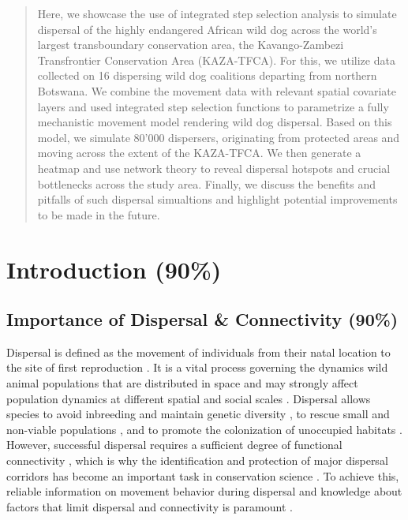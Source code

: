 \documentclass[abstract=on,10pt,a4paper,bibliography=totocnumbered]{article}
\begin{document}
\begin{abstract}
Here, we showcase the use of integrated step selection analysis to simulate
dispersal of the highly endangered African wild dog across the world's largest
transboundary conservation area, the Kavango-Zambezi Transfrontier Conservation
Area (KAZA-TFCA). For this, we utilize data collected on 16 dispersing wild dog
coalitions departing from northern Botswana. We combine the movement data with
relevant spatial covariate layers and used integrated step selection functions
to parametrize a fully mechanistic movement model rendering wild dog dispersal.
Based on this model, we simulate 80'000 dispersers, originating from protected
areas and moving across the extent of the KAZA-TFCA. We then generate a heatmap
and use network theory to reveal dispersal hotspots and crucial bottlenecks
across the study area. Finally, we discuss the benefits and pitfalls of such
dispersal simualtions and highlight potential improvements to be made in the
future.
\end{abstract}

\newpage

\onehalfspacing
\tableofcontents
\doublespacing

\newpage
{}

\linenumbers

\section{Introduction (90\%)}

\subsection{Importance of Dispersal \& Connectivity (90\%)}
Dispersal is defined as the movement of individuals from their natal location to
the site of first reproduction \cite{Howard.1960}. It is a vital process
governing the dynamics wild animal populations that are distributed in space
\citep{Hanski.1998, Clobert.2012} and may strongly affect population dynamics at
different spatial and social scales \citep{Hanski.1999a, Clobert.2012}.
Dispersal allows species to avoid inbreeding and maintain genetic diversity
\citep{Perrin.1999, Perrin.2000, Frankham.2002, Leigh.2012, Baguette.2013}, to
rescue small and non-viable populations \citep{Brown.1977}, and to promote the
colonization of unoccupied habitats \citep{Hanski.1999b, MacArthur.2001}.
However, successful dispersal requires a sufficient degree of functional
connectivity \citep{Fahrig.2003, Clobert.2012}, which is why the identification
and protection of major dispersal corridors has become an important task in
conservation science \citep{Doerr.2011, Rudnick.2012}. To achieve this, reliable
information on movement behavior during dispersal and knowledge about factors
that limit dispersal and connectivity is paramount \citep{Baguette.2013,
Vasudev.2015}.
\end{document}
